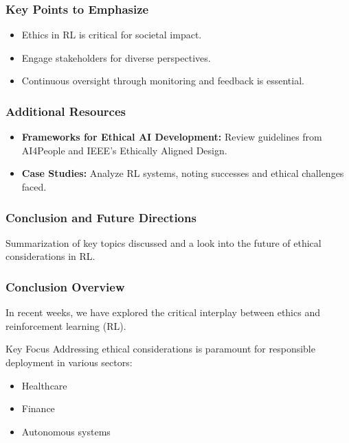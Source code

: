 \documentclass{beamer}
\begin{document}
\begin{frame}[fragile]
    \frametitle{Key Points to Emphasize}
    \begin{itemize}
        \item Ethics in RL is critical for societal impact.
        \item Engage stakeholders for diverse perspectives.
        \item Continuous oversight through monitoring and feedback is essential.
    \end{itemize}
\end{frame}

\begin{frame}[fragile]
    \frametitle{Additional Resources}
    \begin{itemize}
        \item \textbf{Frameworks for Ethical AI Development:} Review guidelines from AI4People and IEEE’s Ethically Aligned Design.
        \item \textbf{Case Studies:} Analyze RL systems, noting successes and ethical challenges faced.
    \end{itemize}
\end{frame}

\begin{frame}[fragile]
    \frametitle{Conclusion and Future Directions}
    Summarization of key topics discussed and a look into the future of ethical considerations in RL.
\end{frame}

\begin{frame}[fragile]
    \frametitle{Conclusion Overview}
    In recent weeks, we have explored the critical interplay between ethics and reinforcement learning (RL).
    
    \begin{block}{Key Focus}
        Addressing ethical considerations is paramount for responsible deployment in various sectors:
        \begin{itemize}
            \item Healthcare
            \item Finance
            \item Autonomous systems
        \end{itemize}
    \end{block}
\end{frame}
\end{document}
